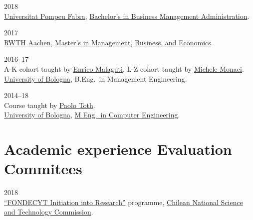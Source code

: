 \begin{paracol}{2}
  \textsc{2018}
\switchcolumn
  \\
  \href{https://www.upf.edu/}{Universitat Pompeu Fabra}, \href{https://www.upf.edu/es/web/graus/grau-ade}{Bachelor's in Business Management Administration}.
\end{paracol}

\begin{paracol}{2}
  \textsc{2017}
\switchcolumn
  \\
  \href{http://www.rwth-aachen.de/}{RWTH Aachen}, \href{http://www.wiwi.rwth-aachen.de/cms/Wirtschaftswissenschaften/Studium/Studiengaenge/Masterstudiengaenge/~camq/Wirtschaftswissenschaft-M-Sc-/?lidx=1}{Master's in Management, Business, and Economics}.
\end{paracol}

\begin{paracol}{2}
  \textsc{2016--17}
\switchcolumn
  \\
  A-K cohort taught by \href{https://scholar.google.com/citations?user=3nD4vYkAAAAJ}{Enrico Malaguti}, L-Z cohort taught by \href{https://scholar.google.com/citations?user=wORMYBMAAAAJ}{Michele Monaci}.\\
  \href{https://www.unibo.it}{University of Bologna}, B.Eng.\ in Management Engineering.
\end{paracol}

\begin{paracol}{2}
  \textsc{2014--18}
\switchcolumn
  \\
  Course taught by \href{https://scholar.google.com/citations?user=2IPL4XIAAAAJ}{Paolo Toth}.\\
  \href{https://www.unibo.it}{University of Bologna}, \href{https://corsi.unibo.it/magistrale/ingegneriainformatica}{M.Eng.\ in Computer Engineering}.
\end{paracol}

\section*{Academic experience {\small Evaluation Commitees}}

\begin{paracol}{2}
  \textsc{2018}
\switchcolumn
  \\
  \href{http://www.conicyt.cl/fondecyt/fondecyt-program/}{``FONDECYT Initiation into Research''} programme, \href{http://www.conicyt.cl/}{Chilean National Science and Technology Commission}.
\end{paracol}

